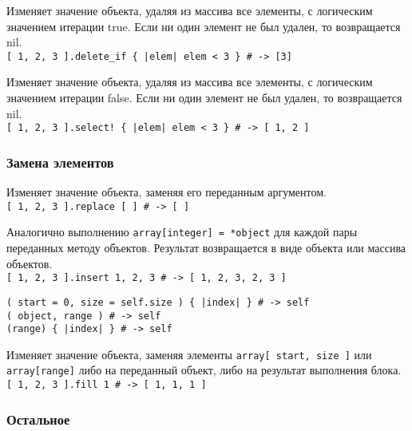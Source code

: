 \begin{methodlist}
  Изменяет значение объекта, удаляя из массива все элементы, с логическим значением итерации true. Если ни один элемент не был удален, то возвращается nil.
  \\\verb![ 1, 2, 3 ].delete_if { |elem| elem < 3 } # -> [3]!

  Изменяет значение объекта, удаляя из массива все элементы, с логическим значением итерации false. Если ни один элемент не был удален, то возвращается nil.
  \\\verb?[ 1, 2, 3 ].select! { |elem| elem < 3 } # -> [ 1, 2 ]?
\end{methodlist}

\subsubsection*{Замена элементов} 

\begin{methodlist}
  Изменяет значение объекта, заменяя его переданным аргументом. 
  \\\verb![ 1, 2, 3 ].replace [ ] # -> [ ]!
 
  Аналогично выполнению \verb!array[integer] = *object! для каждой пары переданных методу объектов. Результат возвращается в виде объекта или массива объектов.
  \\\verb![ 1, 2, 3 ].insert 1, 2, 3 # -> [ 1, 2, 3, 2, 3 ]!
 
  \verb!( start = 0, size = self.size ) { |index| } # -> self!
  \\\verb!( object, range ) # -> self!
  \\\verb!(range) { |index| } # -> self!

  Изменяет значение объекта, заменяя элементы \verb!array[ start, size ]! или \verb!array[range]! либо на переданный объект, либо на результат выполнения блока. 
  \\\verb![ 1, 2, 3 ].fill 1 # -> [ 1, 1, 1 ]!
\end{methodlist}

\subsubsection*{Остальное}

